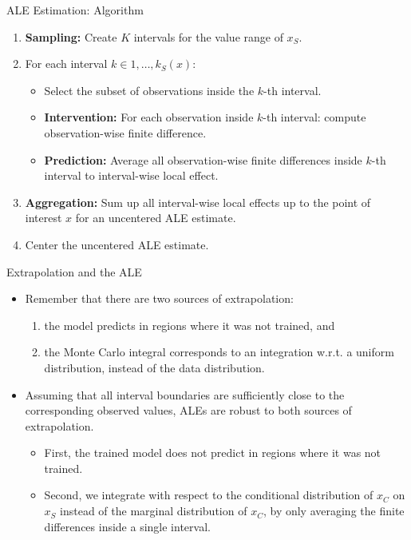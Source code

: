 \documentclass[aspectratio=169]{../latex_main/tntbeamer}  %
\begin{document}
\begin{frame}{ALE Estimation: Algorithm}

\begin{enumerate}
	\item \textbf{Sampling:} Create $K$ intervals for the value range of $x_S$.
	\item For each interval $k \in 1, \dots, k_S(x)$:
	  \begin{itemize}
	  \item Select the subset of observations inside the $k$-th interval.
	  \item \textbf{Intervention:} For each observation inside $k$-th interval: compute observation-wise finite difference.
	  \item \textbf{Prediction:} Average all observation-wise finite differences inside $k$-th interval to interval-wise local effect.
	  \end{itemize}
  \item \textbf{Aggregation:} Sum up all interval-wise local effects up to the point of interest $x$ for an uncentered ALE estimate.
  \item Center the uncentered ALE estimate.
\end{enumerate}

\end{frame}

\begin{frame}{Extrapolation and the ALE}
\begin{itemize}

\item Remember that there are two sources of extrapolation: 
\begin{enumerate}
    \item the model predicts in regions where it was not trained, and
    \item the Monte Carlo integral corresponds to an integration w.r.t. a uniform distribution, instead of the data distribution.
\end{enumerate} 
\pause\smallskip
\item Assuming that all interval boundaries are sufficiently close to the corresponding observed values, ALEs are robust to both sources of extrapolation.
  \begin{itemize}
    \item First, the trained model does not predict in regions where it was not trained.
    \item Second, we integrate with respect to the conditional distribution of $x_C$ on $x_S$ instead of the marginal distribution of $x_C$, by only averaging the finite differences inside a single interval.
  \end{itemize}
\end{itemize}
\end{frame}

	
\end{document}
